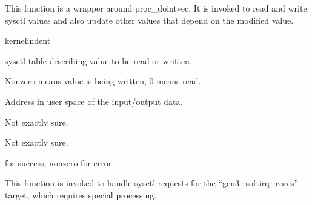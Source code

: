 \documentclass[letterpaper,10pt,english]{sphinxmanual}
\begin{document}
\begin{fulllineitems}

\pysigstartsignatures
{}
\pysigstopsignatures
\sphinxAtStartPar
This function is a wrapper around proc\_dointvec. It is invoked to read and write sysctl values and also update other values that depend on the modified value.

\end{fulllineitems}


\begin{sphinxuseclass}{kernelindent}
\sphinxAtStartPar
{}
\begin{description}
\sphinxAtStartPar
sysctl table describing value to be read or written.

\sphinxAtStartPar
Nonzero means value is being written, 0 means read.

\sphinxAtStartPar
Address in user space of the input/output data.

\sphinxAtStartPar
Not exactly sure.

\sphinxAtStartPar
Not exactly sure.

\end{description}

\sphinxAtStartPar
{}

 for success, nonzero for error.

\end{sphinxuseclass}

\begin{fulllineitems}

\pysigstartsignatures
{}
\pysigstopsignatures
\sphinxAtStartPar
This function is invoked to handle sysctl requests for the “gen3\_softirq\_cores” target, which requires special processing.

\end{fulllineitems}
\end{document}

